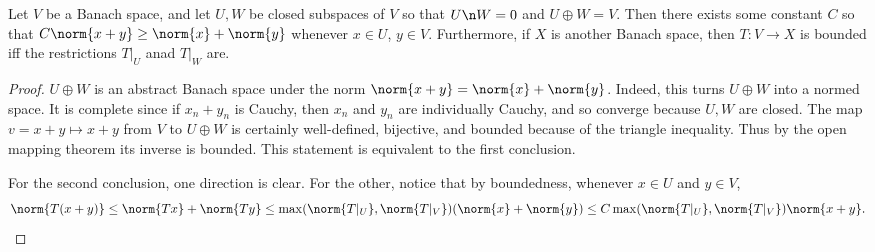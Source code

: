 \documentclass[12pt]{article}
\begin{document}
\begin{lem}\label{sdsd}Let $V$ be a Banach space, and let $U,W$ be closed subspaces of $V$ so that $U\n W = 0$ and $U\oplus W = V$. Then there exists some constant $C$ so that $C\norm{x+y} \geq \norm{x}+\norm{y}$ whenever $x \in U$, $y \in V$. Furthermore, if $X$ is another Banach space, then $T:V \to X$ is bounded iff the restrictions $T|_U$ anad $T|_W$ are.\end{lem}
\begin{proof}$U \oplus W$ is an abstract Banach space under the norm $\norm{x+y} = \norm{x}+\norm{y}$. Indeed, this turns $U \oplus W$ into a normed space. It is complete since if $x_n+y_n$ is Cauchy, then $x_n$ and $y_n$ are individually Cauchy, and so converge because $U,W$ are closed. The map $v=x+y \mapsto x+y$ from $V$ to $U \oplus W$ is certainly well-defined, bijective, and bounded because of the triangle inequality. Thus by the open mapping theorem its inverse is bounded. This statement is equivalent to the first conclusion.

For the second conclusion, one direction is clear. For the other, notice that by boundedness, whenever $x \in U$ and $y \in V$,
\[\norm{T(x+y)} \leq \norm{Tx} + \norm{Ty} \leq \max(\norm{T|_U},\norm{T|_V})(\norm{x}+\norm{y}) \leq C\max(\norm{T|_U},\norm{T|_V})\norm{x+y}.\]\end{proof}
\end{document}
